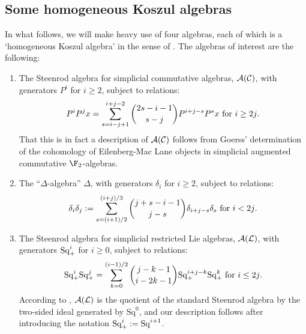 \documentclass[10pt]{article}
\newcommand{\trip}[3]{{#1}_{\smash{#2}}^{\smash{#3}}}
\newcommand{\SqShift}{\Sq_{\smash{+}}}
\newcommand{\Sq}{\mathrm{Sq}}
\newcommand{\Comm}{\calC}
\newcommand{\LieSteen}{\calA(\calL)}
\newcommand{\CommSteen}{\calA(\Comm)}
\newcommand{\deltaAlgebra}{\Delta}
\begin{document}

\begin{SteenrodAlgebrasAndTheirKoszulDuals}
\pagebreak
\section{Some homogeneous Koszul algebras}
In what follows, we will make heavy use of four algebras, each of which is a `homogeneous Koszul algebra' in the sense of \cite{PriddyKoszul.pdf}. The algebras of interest are the following:
\begin{enumerate}\squishlist
\setlength{\parindent}{.25in}
\item The Steenrod algebra for simplicial commutative algebras, $\CommSteen$, with generators $P^i$ for $i\geq2$, subject to relations:
\[P^iP^jx=\sum_{s=i-j+1}^{i+j-2}{2s-i-1\choose s-j}P^{i+j-s}P^sx\textup{ for $i\geq2j$}.\]
That this is in fact a description of $\CommSteen$ follows from Goerss' determination \cite[p.14]{MR1089001} of the cohomology of Eilenberg-Mac Lane objects in simplicial augmented commutative $\F_2$-algebras.

\item The ``$\Delta$-algebra'' $\deltaAlgebra$, with generators $\delta_i$ for $i\geq2$, subject to relations:
\[\delta_i\delta_j:=\sum_{s=(i+1)/2}^{(i+j)/3}{j+s-i-1\choose j-s}\delta_{i+j-s}\delta_s\textup{ for $i<2j$.}\]
\item The Steenrod algebra for simplicial restricted Lie algebras, $\LieSteen$, with generators $\SqShift^i$ for $i\geq0$, subject to relations:
\[\SqShift^i\SqShift^j=\sum_{k=0}^{(i-1)/2}{j-k-1\choose i-2k-1}\SqShift^{i+j-k}\SqShift^k\textup{\ for $i\leq2j$.}\]
According to \cite[\S7]{PriddySimplicialLie.pdf}, $\LieSteen$ is the quotient of the standard Steenrod algebra by the two-sided ideal generated by $\Sq^0$, and our description follows after introducing the notation $\SqShift^i:=\Sq^{i+1}$.
%


\end{enumerate}
\end{SteenrodAlgebrasAndTheirKoszulDuals}
\end{document}
